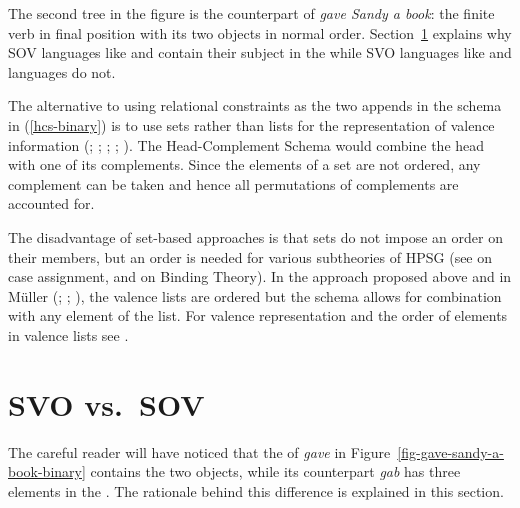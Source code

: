 \documentclass[output=paper,biblatex,babelshorthands,newtxmath,draftmode,colorlinks,citecolor=brown]{langscibook}
\begin{document}
The second tree in the figure is the  counterpart of \emph{gave Sandy a book}: the finite verb
in final position with its two objects in normal order. Section~\ref{sec-svo-sov} explains why SOV
languages like  and  contain their subject in the \compsl while SVO languages like
 and  languages do not.

The alternative to using relational constraints as the two appends in the schema in (\ref{hcs-binary}) is to
use sets rather than lists for the representation of valence information
(\citealp[Section~4]{Gunji86a}; \citealp[]{HN89a}; \citealp[]{Pollard90a-Eng};
\citealp[]{Oliva92b}; \citealp*[]{EEU92a}). The Head-Complement Schema would
combine the head with one of its complements. Since the elements of a set are not ordered, any
complement can be taken and hence all permutations of complements are accounted for. 

The disadvantage of set-based approaches is that sets do not impose an order on their members, but
an order is needed for various subtheories of HPSG (see  on case assignment,
and  on Binding Theory). In the approach proposed above and in Müller
(\citeyear[]{Mueller2005c}; \citeyear[]{MuellerHPSGHandbook}; \citeyear[--54]{MuellerCoreGram}), the valence lists are ordered but the schema allows for combination with
any element of the list. For valence representation and the order of elements in valence lists see
.\label{order:page-scrambling-end}


\section{SVO vs.\ SOV}
\label{sec-svo-sov}

The careful reader will have noticed that the \compsl of
\emph{gave} in Figure~\ref{fig-gave-sandy-a-book-binary} contains the two objects, while its
 counterpart \emph{gab} has three elements in the \compsl. The rationale behind this
difference is explained in this section.
\end{document}
